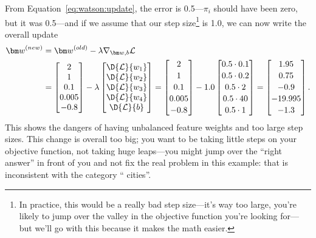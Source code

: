 From Equation~\ref{eq:watson:update}, the error is 0.5---$\pi_i$ should have
been zero, but it was 0.5---and if we assume that our step size\footnote{In practice, this would
  be a really bad step size---it's way too large, you're likely to jump over
  the valley in the objective function you're looking for---but we'll go with
  this because it makes the math easier.} is 1.0,
%
we can now write the overall update
\begin{align}
  {\bm w}^{(new)} & = {\bm w}^{(old)} - \lambda \nabla_{{\bm w}, b}
                    \mathcal{L} \\ &  = 
  \begin{bmatrix}
    2 \\
1  \\
0.1  \\
  0.005  \\
  -0.8 \\
\end{bmatrix} - \lambda  \begin{bmatrix}
\D{\mathcal{L}}{w_1}  \\
\D{\mathcal{L}}{w_2}  \\
  \D{\mathcal{L}}{w_3}  \\
  \D{\mathcal{L}}{w_4}  \\  
\D{\mathcal{L}}{b}  \\  
\end{bmatrix}
= \begin{bmatrix}
  2 \watsonvspace \\
1 \watsonvspace \\
0.1 \watsonvspace \\
  0.005 \watsonvspace \\
  -0.8 \\
\end{bmatrix} - 1.0  \begin{bmatrix}
  0.5 \cdot 0.1 \watsonvspace \\
0.5 \cdot 0.2 \watsonvspace \\
0.5 \cdot 2 \watsonvspace \\
  0.5 \cdot 40 \watsonvspace \\
  0.5 \cdot 1
\end{bmatrix} = \begin{bmatrix}
  1.95 \watsonvspace \\
0.75 \watsonvspace \\
-0.9 \watsonvspace \\
  -19.995 \watsonvspace \\
  -1.3 \nonumber \\
\end{bmatrix}.
\label{eq:watson:update-ex}
\end{align}
This shows the dangers of having unbalanced feature weights and too large step
sizes.  This change is overall too big; you want to be taking little steps on
your objective function, not taking huge leaps---you might jump over the
``right answer'' in front of you and not fix the real problem in this example:
that  is inconsistent with the category `` cities''.

